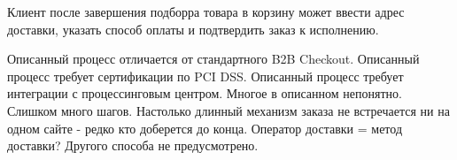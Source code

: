 {\begin{wikilong}
Клиент после завершения подборра товара в корзину может ввести адрес доставки, указать способ оплаты и подтвердить заказ к исполнению.
\end{wikilong}


\begin{teamidea}
Описанный процесс отличается от стандартного B2B Checkout. 
Описанный процесс требует сертификации по PCI DSS.
Описанный процесс требует интеграции с процессинговым центром.
Многое в описанном непонятно.
Слишком много шагов. Настолько длинный механизм заказа не встречается ни на одном сайте - редко кто доберется до конца.
Оператор доставки = метод доставки? Другого способа не предусмотрено.
\end{teamidea}


}
